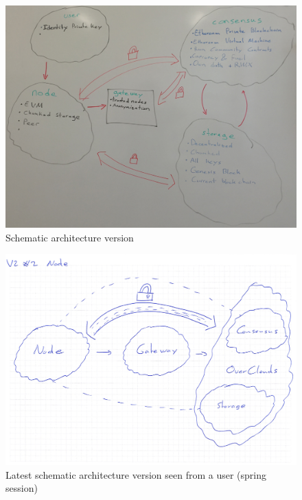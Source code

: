 \begin{figure}[htpb]
\centering
\begin{adjustbox}{center}
\includegraphics[scale=0.22]{annexes/concepts/oc-concept-draft-global-view-idea.jpg}
\end{adjustbox}
\caption{Schematic architecture version
\label{fig:oc-concept-draft-global-view-idea}} 
\end{figure}

\begin{figure}[htpb]
\centering
\begin{adjustbox}{center}
\includegraphics[scale=0.7]{annexes/concepts/oc-concept-draft-global-view-idea-2-node-ss.jpeg}
\end{adjustbox}
\caption{Latest schematic architecture version seen from a user (spring session)
\label{fig:oc-schematic-latest-architecture-user-ss}} 
\end{figure}



